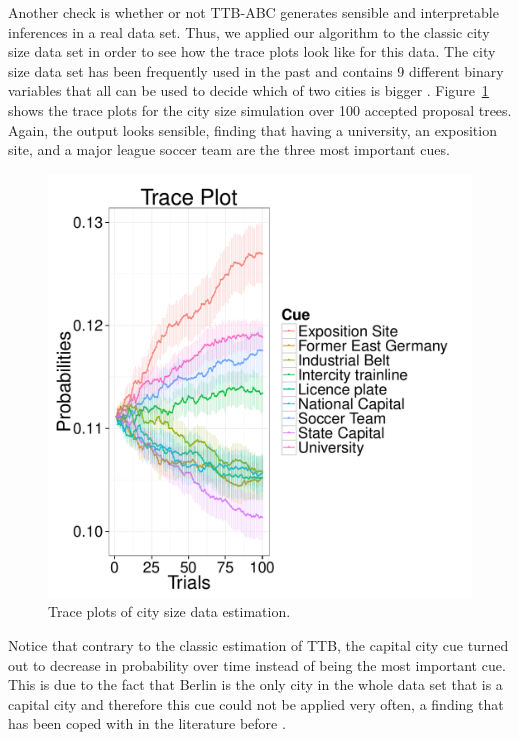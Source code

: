 \documentclass[a4paper,man, natbib]{apa6}
\begin{document}
Another check is whether or not TTB-ABC generates sensible and interpretable inferences in a real data set. Thus, we applied our algorithm to the classic city size data set in order to see how the trace plots look like for this data. The city size data set has been frequently used in the past and contains 9 different binary variables that all can be used to decide which of two cities is bigger \citep{chater2003fast, gigerenzer2009homo}. Figure~\ref{fig:citytrace} shows the trace plots for the city size simulation over 100 accepted proposal trees. Again, the output looks sensible, finding that having a university, an exposition site, and a major league soccer team are the three most important cues.

\begin{figure}[htb!]
  \caption{Trace plots of city size data estimation.}
\label{fig:citytrace}
  \centering
    \includegraphics[scale=0.5]{figs/citytrace.pdf}
\end{figure}

Notice that contrary to the classic estimation of TTB, the capital city cue turned out to decrease in probability over time instead of being the most important cue. This is due to the fact that Berlin is the only city in the whole data set that is a capital city and therefore this cue could not be applied very often, a finding that has been coped with in the literature before \citep{broder2012quest}.
\end{document}
